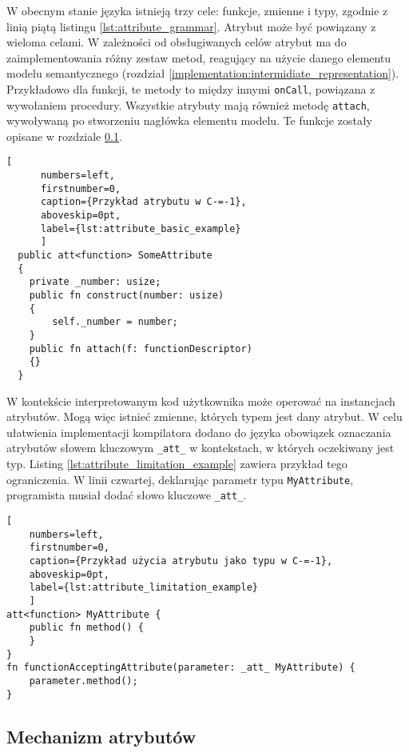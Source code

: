 W obecnym stanie języka istnieją trzy cele: funkcje, zmienne i typy, zgodnie z linią piątą listingu \ref{lst:attribute_grammar}.
Atrybut może być powiązany z wieloma celami.
W zależności od obsługiwanych celów atrybut ma do zaimplementowania różny zestaw metod, reagujący na użycie danego elementu modelu semantycznego (rozdział \ref{implementation:intermidiate_representation}).
Przykładowo dla funkcji, te metody to między innymi \lstinline{onCall}, powiązana z wywołaniem procedury.
Wszystkie atrybuty mają również metodę \lstinline{attach}, wywoływaną po stworzeniu nagłówka elementu modelu.
Te funkcje zostały opisane w rozdziale \ref{Attributes_mechanism_cm1}.

\begin{minipage}{\linewidth}
  
	\begin{lstlisting}[
	  numbers=left,
	  firstnumber=0,
	  caption={Przykład atrybutu w C-=-1},
	  aboveskip=0pt,
	  label={lst:attribute_basic_example}
	  ]
  public att<function> SomeAttribute
  {
	private _number: usize;
	public fn construct(number: usize)
	{
		self._number = number;
	}
	public fn attach(f: functionDescriptor)
	{}
  }
  \end{lstlisting}
\end{minipage}

W kontekście interpretowanym kod użytkownika może operować na instancjach atrybutów.
Mogą więc istnieć zmienne, których typem jest dany atrybut.
W celu ułatwienia implementacji kompilatora dodano do języka obowiązek oznaczania atrybutów słowem kluczowym \lstinline{_att_} w kontekstach, w których oczekiwany jest typ.
Listing \ref{lst:attribute_limitation_example} zawiera przykład tego ograniczenia.
W linii czwartej, deklarując parametr typu \lstinline{MyAttribute}, programista musiał dodać słowo kluczowe \lstinline{_att_}.

\begin{lstlisting}[
	numbers=left,
	firstnumber=0,
	caption={Przykład użycia atrybutu jako typu w C-=-1},
	aboveskip=0pt,
	label={lst:attribute_limitation_example}
	]
att<function> MyAttribute {
	public fn method() {
	}
}
fn functionAcceptingAttribute(parameter: _att_ MyAttribute) {
	parameter.method();
}
\end{lstlisting}
\subsection{Mechanizm atrybutów}
\label{Attributes_mechanism_cm1}

